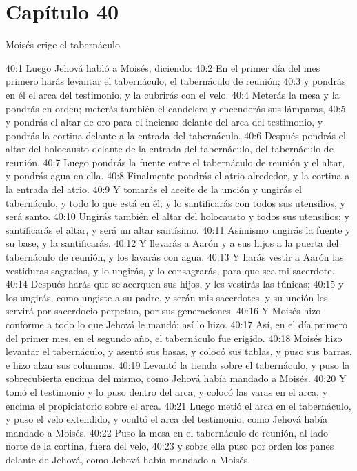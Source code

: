 \section*{Capítulo 40}
Moisés erige el tabernáculo 

40:1 Luego Jehová habló a Moisés, diciendo: 
40:2 En el primer día del mes primero harás levantar el tabernáculo, el tabernáculo de reunión; 
40:3 y pondrás en él el arca del testimonio, y la cubrirás con el velo. 
40:4 Meterás la mesa y la pondrás en orden; meterás también el candelero y encenderás sus lámparas, 
40:5 y pondrás el altar de oro para el incienso delante del arca del testimonio, y pondrás la cortina delante a la entrada del tabernáculo. 
40:6 Después pondrás el altar del holocausto delante de la entrada del tabernáculo, del tabernáculo de reunión. 
40:7 Luego pondrás la fuente entre el tabernáculo de reunión y el altar, y pondrás agua en ella. 
40:8 Finalmente pondrás el atrio alrededor, y la cortina a la entrada del atrio. 
40:9 Y tomarás el aceite de la unción y ungirás el tabernáculo, y todo lo que está en él; y lo santificarás con todos sus utensilios, y será santo. 
40:10 Ungirás también el altar del holocausto y todos sus utensilios; y santificarás el altar, y será un altar santísimo. 
40:11 Asimismo ungirás la fuente y su base, y la santificarás. 
40:12 Y llevarás a Aarón y a sus hijos a la puerta del tabernáculo de reunión, y los lavarás con agua. 
40:13 Y harás vestir a Aarón las vestiduras sagradas, y lo ungirás, y lo consagrarás, para que sea mi sacerdote. 
40:14 Después harás que se acerquen sus hijos, y les vestirás las túnicas; 
40:15 y los ungirás, como ungiste a su padre, y serán mis sacerdotes, y su unción les servirá por sacerdocio perpetuo, por sus generaciones. 
40:16 Y Moisés hizo conforme a todo lo que Jehová le mandó; así lo hizo. 
40:17 Así, en el día primero del primer mes, en el segundo año, el tabernáculo fue erigido. 
40:18 Moisés hizo levantar el tabernáculo, y asentó sus basas, y colocó sus tablas, y puso sus barras, e hizo alzar sus columnas. 
40:19 Levantó la tienda sobre el tabernáculo, y puso la sobrecubierta encima del mismo, como Jehová había mandado a Moisés. 
40:20 Y tomó el testimonio y lo puso dentro del arca, y colocó las varas en el arca, y encima el propiciatorio sobre el arca. 
40:21 Luego metió el arca en el tabernáculo, y puso el velo extendido, y ocultó el arca del testimonio, como Jehová había mandado a Moisés. 
40:22 Puso la mesa en el tabernáculo de reunión, al lado norte de la cortina, fuera del velo, 
40:23 y sobre ella puso por orden los panes delante de Jehová, como Jehová había mandado a Moisés. 
